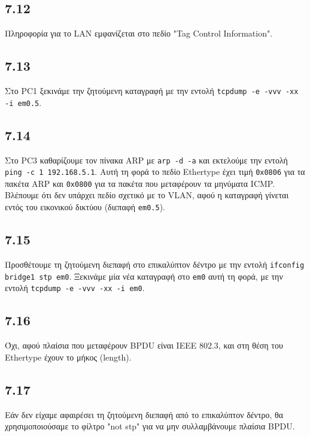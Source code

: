 \documentclass[a4paper, 12pt]{article}
\begin{document}
	\subsection*{7.12}
		Πληροφορία για το LAN εμφανίζεται στο πεδίο "Tag Control Information".

	\subsection*{7.13}
		Στο PC1 ξεκινάμε την ζητούμενη καταγραφή με την εντολή \verb|tcpdump -e -vvv -xx -i em0.5|.

	\subsection*{7.14}
		Στο PC3 καθαρίζουμε τον πίνακα ARP με \verb|arp -d -a| και εκτελούμε την εντολή \verb|ping -c 1 192.168.5.1|. Αυτή τη φορά το πεδίο Ethertype έχει τιμή \verb|0x0806| για τα πακέτα ARP και \verb|0x0800| για τα πακέτα που μεταφέρουν τα μηνύματα ICMP. Βλέπουμε ότι δεν υπάρχει πεδίο σχετικό με το VLAN, αφού η καταγραφή γίνεται εντός του εικονικού δικτύου (διεπαφή \verb|em0.5|).

	\subsection*{7.15}
		Προσθέτουμε τη ζητούμενη διεπαφή στο επικαλύπτον δέντρο με την εντολή \verb|ifconfig bridge1 stp em0|. Ξεκινάμε μία νέα καταγραφή στο \verb|em0| αυτή τη φορά, με την εντολή \verb|tcpdump -e -vvv -xx -i em0|.

	\subsection*{7.16}
		Όχι, αφού πλαίσια που μεταφέρουν BPDU είναι IEEE 802.3, και στη θέση του Ethertype έχουν το μήκος (length).

	\subsection*{7.17}
		Εάν δεν είχαμε αφαιρέσει τη ζητούμενη διεπαφή από το επικαλύπτον δέντρο, θα χρησιμοποιούσαμε το φίλτρο "not stp" για να μην συλλαμβάνουμε πλαίσια BPDU.
			
\end{document}

